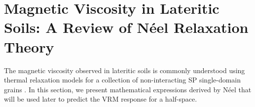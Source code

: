 \documentclass[journal]{IEEEtran}  %
\begin{document}

\section{Magnetic Viscosity in Lateritic Soils: A Review of N\'{e}el Relaxation Theory}
\label{secAfterEffect} The magnetic viscosity observed in lateritic
soils is commonly understood using thermal relaxation models
\cite{Neel1949} for a collection of non-interacting SP single-domain
grains
\cite{Buselli1982,Moskowitz1985,Dabas1992,Pasion2002,Billings2003,Pasion2007}.
In this section, we present mathematical expressions derived by
N\'{e}el \cite{Neel1949} that will be used later to predict the VRM
response for a half-space.

\end{document}
